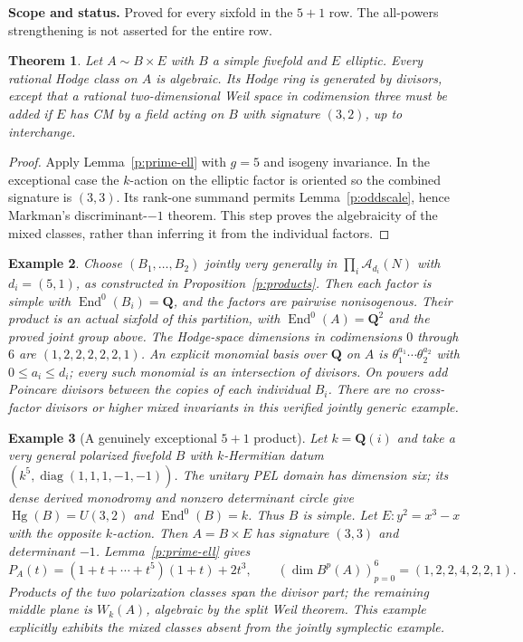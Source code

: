 \documentclass[11pt,reqno]{article}
\theoremstyle{emphasizedplain}
\newtheorem{theorem}{Theorem}[section]
\theoremstyle{emphasizeddefinition}
\newtheorem{example}[theorem]{Example}
\theoremstyle{emphasizeddefinition}
\DeclareMathOperator{\End}{End}
\DeclareMathOperator{\Hg}{Hg}
\newcommand{\Q}{\mathbf Q}
\newcommand{\status}[1]{%
  \par\nobreak\smallskip\noindent
  {\setlength{\fboxsep}{7pt}%
   \colorbox{ScopeBackground}{%
    \parbox{\dimexpr\linewidth-2\fboxsep\relax}{%
     \small\textbf{\textcolor{HeadingInk}{Scope and status.}} #1}}}%
  \par\nobreak\medskip}
\begin{document}
\status{Proved for every sixfold in the $5+1$ row. The all-powers
strengthening is not asserted for the entire row.}
\begin{theorem}
Let $A\sim B\times E$ with $B$ a simple fivefold and $E$ elliptic.
Every rational Hodge class on $A$ is algebraic. Its Hodge ring is generated
by divisors, except that a rational two-dimensional Weil space in
codimension three must be added if $E$ has CM by a field acting on $B$
with signature $(3,2)$, up to interchange.
\end{theorem}
\begin{proof}
Apply Lemma~\ref{p:prime-ell} with $g=5$ and isogeny invariance.
In the exceptional case the $k$-action on the elliptic factor is oriented
so the combined signature is $(3,3)$. Its rank-one summand permits
Lemma~\ref{p:oddscale}, hence Markman's discriminant-$-1$ theorem.
This step proves the algebraicity of the mixed classes, rather than
inferring it from the individual factors.
\end{proof}
\begin{example}
Choose $(B_1,\ldots,B_{2})$ jointly very generally in
$\prod_i\mathcal A_{d_i}(N)$ with $d_i=(5,1)$,
as constructed in Proposition~\ref{p:products}. Then each factor is
simple with $\End^0(B_i)=\Q$, and the factors are pairwise nonisogenous.
Their product is an actual sixfold of this partition, with
$\End^0(A)=\Q^{2}$ and the proved joint group above.
The Hodge-space dimensions in codimensions $0$ through $6$ are
$(1,2,2,2,2,2,1)$.
An explicit monomial basis over $\Q$ on $A$ is
$\theta_1^{a_1}\cdots\theta_{2}^{a_{2}}$ with
$0\leq a_i\leq d_i$; every such monomial is an intersection of divisors.
On powers add Poincare divisors between the copies of each individual
$B_i$. There are no cross-factor divisors or higher mixed invariants in
this verified jointly generic example.
\end{example}
\begin{example}[A genuinely exceptional $5+1$ product]
Let $k=\Q(i)$ and take a very general polarized fivefold $B$ with
$k$-Hermitian datum $(k^5,\operatorname{diag}(1,1,1,-1,-1))$.
The unitary PEL domain has dimension six; its dense derived monodromy
and nonzero determinant circle give $\Hg(B)=U(3,2)$ and
$\End^0(B)=k$. Thus $B$ is simple. Let $E:y^2=x^3-x$ with the opposite
$k$-action. Then $A=B\times E$ has signature $(3,3)$ and determinant
$-1$. Lemma~\ref{p:prime-ell} gives
\[
 P_A(t)=(1+t+\cdots+t^5)(1+t)+2t^3,
 \qquad (\dim B^p(A))_{p=0}^6=(1,2,2,4,2,2,1).
\]
Products of the two polarization classes span the divisor part;
the remaining middle plane is $W_k(A)$, algebraic by the split Weil
theorem. This example explicitly exhibits the mixed classes absent
from the jointly symplectic example.
\end{example}
\end{document}
